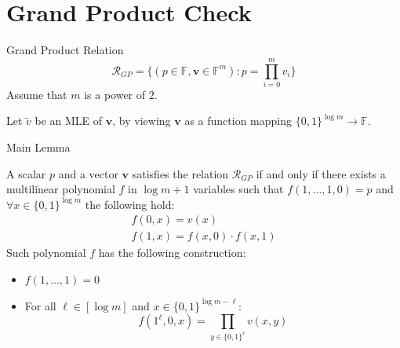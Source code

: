 \documentclass{zkdl-presentation-template}
\begin{document}
    \section{Grand Product Check}

    \begin{frame}{Grand Product Relation}
        \begin{equation*}
        \mathcal{R}_{GP} = \big\{ (p \in \mathbb{F}, \mathbf{v} \in \mathbb{F}^m)\colon p = \prod_{i=0}^m v_i \big\} \label{grand-product-relation}
        \end{equation*}
        Assume that $m$ is a power of $2$.

        
        
        Let $\widetilde{v}$ be an MLE of $\mathbf{v}$, by viewing $\mathbf{v}$ as a 
        function mapping $\{0,1\}^{\log m} \rightarrow \mathbb{F}$.
    \end{frame}

    \begin{frame}{Main Lemma}
        \begin{lemma}
        A scalar $p$ and a vector $\mathbf{v}$ satisfies the relation $\mathcal{R}_{GP}$ if and only if there exists a 
        multilinear polynomial $f$ in $\log m + 1$ variables such that $f(1,\dots,1, 0) = p$ and $\forall x \in \{0,1\}^{\log m}$
        the following hold:
        \begin{gather*}
        f(0, x) = v(x)\\
        f(1,x) = f(x, 0) \cdot f(x, 1)
        \end{gather*}
        Such polynomial $f$ has the following construction: \begin{itemize}
            \item $f(1,\dots,1) = 0$
            \item For all $\ell \in [\log m]$ and $x \in \{0,1\}^{\log m - \ell}$: \\ 
            \vspace{-0.8em}
            \begin{equation*}
                f(1^\ell, 0, x) = \prod_{y \in \{0,1\}^\ell}v(x,y)
            \end{equation*}
        \end{itemize}
        \end{lemma}
    \end{frame}
\end{document}
